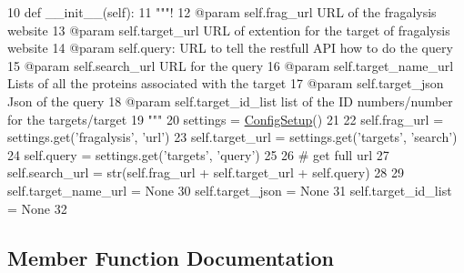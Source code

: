 \begin{DoxyCode}
10     \textcolor{keyword}{def }\_\_init\_\_(self):
11         \textcolor{stringliteral}{"""!}
12 \textcolor{stringliteral}{        @param self.frag\_url URL of the fragalysis website}
13 \textcolor{stringliteral}{        @param self.target\_url URL of extention for the target of fragalysis website}
14 \textcolor{stringliteral}{        @param self.query: URL to tell the restfull API how to do the query}
15 \textcolor{stringliteral}{        @param self.search\_url URL for the query }
16 \textcolor{stringliteral}{        @param self.target\_name\_url Lists of all the proteins associated with the target}
17 \textcolor{stringliteral}{        @param self.target\_json Json of the query}
18 \textcolor{stringliteral}{        @param self.target\_id\_list list of the ID numbers/number for the targets/target}
19 \textcolor{stringliteral}{        """}
20         settings = \hyperlink{namespacefragalysis__api_1_1xcglobalscripts_1_1set__config_a9b5445f82604ad45c1e85e2b07e4a317}{ConfigSetup}()
21 
22         self.frag\_url = settings.get(\textcolor{stringliteral}{'fragalysis'}, \textcolor{stringliteral}{'url'})
23         self.target\_url = settings.get(\textcolor{stringliteral}{'targets'}, \textcolor{stringliteral}{'search'})
24         self.query = settings.get(\textcolor{stringliteral}{'targets'}, \textcolor{stringliteral}{'query'})
25 
26         \textcolor{comment}{# get full url}
27         self.search\_url = str(self.frag\_url + self.target\_url + self.query)
28 
29         self.target\_name\_url = \textcolor{keywordtype}{None}
30         self.target\_json = \textcolor{keywordtype}{None}
31         self.target\_id\_list = \textcolor{keywordtype}{None}
32 
\end{DoxyCode}


\subsection{Member Function Documentation}
\mbox{\label{classfragalysis__api_1_1xcextracter_1_1getdata_1_1_get_targets_data_af26e1f97fa431c2bb490985e7af0eb45}} 
